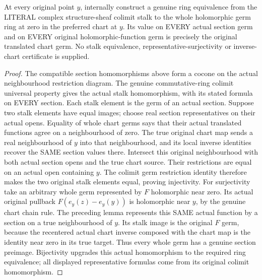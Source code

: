 \begin{theorem}
\label{hir:real-domain-actual-complex-sheaf-stalk-whole-germ-equivalence}
\leanok
At every original point $y$, internally construct a genuine ring equivalence
from the LITERAL complex structure-sheaf colimit stalk to the whole
holomorphic germ ring at zero in the preferred chart at $y$. Its value on
EVERY actual section germ and on EVERY original holomorphic-function germ
is precisely the original translated chart germ. No stalk equivalence,
representative-surjectivity or inverse-chart certificate is supplied.
\end{theorem}
\begin{proof}
The compatible section homomorphisms above form a cocone on the actual
neighbourhood restriction diagram. The genuine commutative-ring colimit
universal property gives the actual stalk homomorphism, with its stated
formula on EVERY section. Each stalk element is the germ of an actual
section. Suppose two stalk elements have equal images; choose real section
representatives on their actual opens. Equality of whole chart germs says
that their actual translated functions agree on a neighbourhood of zero.
The true original chart map sends a real neighbourhood of $y$ into that
neighbourhood, and its local inverse identities recover the SAME section
values there. Intersect this original neighbourhood with both actual section
opens and the true chart source. Their restrictions are equal on an actual
open containing $y$. The colimit germ restriction identity therefore makes
the two original stalk elements equal, proving injectivity.
For surjectivity take an arbitrary whole germ represented by $F$ holomorphic
near zero. Its actual original pullback $F(e_y(z)-e_y(y))$ is holomorphic
near $y$, by the genuine chart chain rule. The preceding lemma represents
this SAME actual function by a section on a true neighbourhood of $y$.
Its stalk image is the original $F$ germ, because the recentered actual
chart inverse composed with the chart map is the identity near zero in
its true target. Thus every whole germ has a genuine section preimage.
Bijectivity upgrades this actual homomorphism to the required ring
equivalence; all displayed representative formulas come from its original
colimit homomorphism.
\end{proof}

